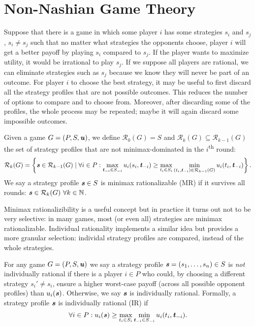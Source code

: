\section{Non-Nashian Game Theory}
Suppose that there is a game in which some player $i$ has some strategies $s_i$ and $s_j$, $s_i \ne s_j$ such that no matter what strategies the opponents choose, player $i$ will get a better payoff by playing $s_i$ compared to $s_j$.
If the player wants to maximize utility, it would be irrational to play $s_j$.
If we suppose all players are rational, we can eliminate strategies such as $s_j$ because we know they will never be part of an outcome.
For player $i$ to choose the best strategy, it may be useful to first discard all the strategy profiles that are not possible outcomes.
This reduces the number of options to compare and to choose from.
Moreover, after discarding some of the profiles, the whole process may be repeated; maybe it will again discard some impossible outcomes.

\begin{definition}
  Given a game $G = (P, S, \boldsymbol{\mathit{u}})$, we define $\mathcal{R}_0(G) = S$ and $\mathcal{R}_k(G) \subseteq \mathcal{R}_{k-1}(G)$ the set of strategy profiles that are not minimax-dominated in the $i$\textsuperscript{th} round:
  \[
    \mathcal{R}_k(G) = \left\{\boldsymbol{\mathit{s}} \in \mathcal{R}_{k-1}(G) \mid \forall i \in P: \max_{\boldsymbol{\mathit{t}}_{-i} \in S_{-i}}u_i(s_i, \boldsymbol{\mathit{t}}_{-i}) \ge \max_{t_i \in S_i}\min_{(t_i, \boldsymbol{\mathit{t}}_{-i}) \in \mathcal{R}_{k-1}(G)}u_i(t_i, \boldsymbol{\mathit{t}}_{-i})\right\}.
  \]
  We say a strategy profile $\boldsymbol{\mathit{s}} \in S$ is minimax rationalizable (MR) if it survives all rounds: $\boldsymbol{\mathit{s}} \in \mathcal{R}_k(G)\ \forall k \in \mathbb{N}$.
\end{definition}

Minimax rationalizibility is a useful concept but in practice it turns out not to be very selective: in many games, most (or even all) strategies are minimax rationalizable.
Individual rationality implements a similar idea but provides a more granular selection: individal strategy profiles are compared, instead of the whole strategies.

\begin{definition}
  For any game $G = (P, S, \boldsymbol{\mathit{u}})$ we say a strategy profile $\boldsymbol{\mathit{s}} = (s_1, \dots, s_n) \in S$ is \textit{not} individually rational if there is a player $i \in P$ who could, by choosing a different strategy $s_i' \ne s_i$, ensure a higher worst-case payoff (across all possible opponent profiles) than $u_i(\boldsymbol{\mathit{s}})$.
  Otherwise, we say $\boldsymbol{\mathit{s}}$ is individually rational.
  Formally, a strategy profile $\boldsymbol{\mathit{s}}$ is individually rational (IR) if
  \[
    \forall i \in P: u_i(\boldsymbol{\mathit{s}}) \ge \max_{t_i\in S_i}\min_{\boldsymbol{\mathit{t}}_{-i} \in S_{-i}}u_i(t_i, \boldsymbol{\mathit{t}}_{-i}).
  \]
\end{definition}

